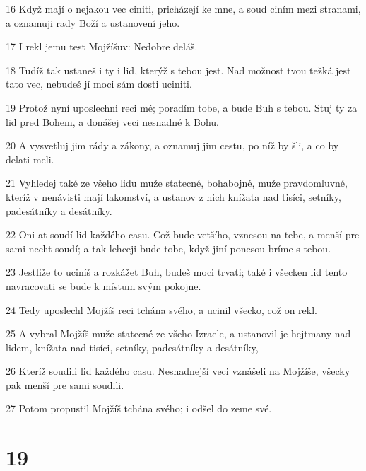 \par 16 Když mají o nejakou vec ciniti, pricházejí ke mne, a soud ciním mezi stranami, a oznamuji rady Boží a ustanovení jeho.
\par 17 I rekl jemu test Mojžíšuv: Nedobre deláš.
\par 18 Tudíž tak ustaneš i ty i lid, kterýž s tebou jest. Nad možnost tvou težká jest tato vec, nebudeš jí moci sám dosti uciniti.
\par 19 Protož nyní uposlechni reci mé; poradím tobe, a bude Buh s tebou. Stuj ty za lid pred Bohem, a donášej veci nesnadné k Bohu.
\par 20 A vysvetluj jim rády a zákony, a oznamuj jim cestu, po níž by šli, a co by delati meli.
\par 21 Vyhledej také ze všeho lidu muže statecné, bohabojné, muže pravdomluvné, kteríž v nenávisti mají lakomství, a ustanov z nich knížata nad tisíci, setníky, padesátníky a desátníky.
\par 22 Oni at soudí lid každého casu. Což bude vetšího, vznesou na tebe, a menší pre sami necht soudí; a tak lehceji bude tobe, když jiní ponesou bríme s tebou.
\par 23 Jestliže to uciníš a rozkážet Buh, budeš moci trvati; také i všecken lid tento navracovati se bude k místum svým pokojne.
\par 24 Tedy uposlechl Mojžíš reci tchána svého, a ucinil všecko, což on rekl.
\par 25 A vybral Mojžíš muže statecné ze všeho Izraele, a ustanovil je hejtmany nad lidem, knížata nad tisíci, setníky, padesátníky a desátníky,
\par 26 Kteríž soudili lid každého casu. Nesnadnejší veci vznášeli na Mojžíše, všecky pak menší pre sami soudili.
\par 27 Potom propustil Mojžíš tchána svého; i odšel do zeme své.

\chapter{19}


